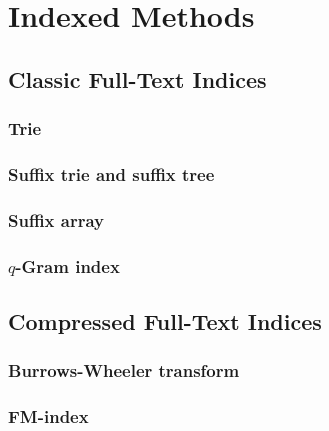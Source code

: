 \chapter{Indexed Methods}
\section{Classic Full-Text Indices}
\subsection{Trie}
\subsection{Suffix trie and suffix tree}
\subsection{Suffix array}
\subsection{$q$-Gram index}
\section{Compressed Full-Text Indices}
\subsection{Burrows-Wheeler transform}
\subsection{FM-index}
